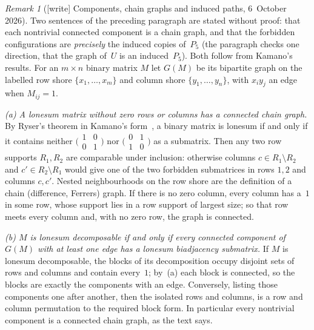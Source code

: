 \documentclass[11pt]{article}
\theoremstyle{remark}\newtheorem{remark}{Remark}
\begin{document}
\begin{remark}[{[write]} Components, chain graphs and induced paths, 6~October 2026]\label{lsd:rem:graph}
Two sentences of the preceding paragraph are stated without proof: that each
nontrivial connected component is a chain graph, and that the forbidden
configurations are \emph{precisely} the induced copies of~$P_5$ (the paragraph
checks one direction, that the graph of~$U$ is an induced~$P_5$). Both follow
from Kamano's results. For an $m\times n$ binary matrix $M$ let $G(M)$ be its
bipartite graph on the labelled row shore $\{x_1,\dots,x_m\}$ and column shore
$\{y_1,\dots,y_n\}$, with $x_iy_j$ an edge when $M_{ij}=1$.

\emph{(a) A lonesum matrix without zero rows or columns has a connected chain
graph.} By Ryser's theorem in Kamano's form~\cite[Proposition~1.1]{Kamano}, a
binary matrix is lonesum if and only if it contains neither
$\bigl(\begin{smallmatrix}1&0\\0&1\end{smallmatrix}\bigr)$ nor
$\bigl(\begin{smallmatrix}0&1\\1&0\end{smallmatrix}\bigr)$ as a submatrix.
Then any two row supports $R_1,R_2$ are comparable under inclusion: otherwise
columns $c\in R_1\setminus R_2$ and $c'\in R_2\setminus R_1$ would give one of
the two forbidden submatrices in rows $1,2$ and columns $c,c'$. Nested
neighbourhoods on the row shore are the definition of a chain (difference,
Ferrers) graph. If there is no zero column, every column has a~$1$ in some row,
whose support lies in a row support of largest size; so that row meets every
column and, with no zero row, the graph is connected.

\emph{(b) $M$ is lonesum decomposable if and only if every connected component
of $G(M)$ with at least one edge has a lonesum biadjacency submatrix.} If $M$
is lonesum decomposable, the blocks of its decomposition occupy disjoint sets
of rows and columns and contain every~$1$; by~(a) each block is connected, so
the blocks are exactly the components with an edge. Conversely, listing those
components one after another, then the isolated rows and columns, is a row and
column permutation to the required block form. In particular every nontrivial
component is a connected chain graph, as the text says.


\end{remark}
\end{document}
